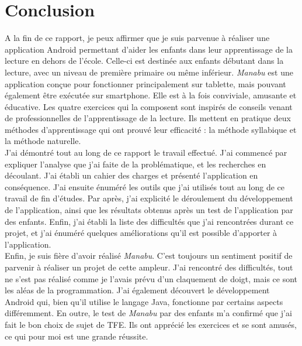 \section{Conclusion}
A la fin de ce rapport, je peux affirmer que je suis parvenue à réaliser une application Android permettant d'aider les enfants dans leur apprentissage de la lecture en dehors de l'école. Celle-ci est destinée aux enfants débutant dans la lecture, avec un niveau de première primaire ou même inférieur. \textit{Manabu} est une application conçue pour fonctionner principalement sur tablette, mais pouvant également être exécutée sur smartphone. Elle est à la fois conviviale, amusante et éducative. Les quatre exercices qui la composent sont inspirés de conseils venant de professionnelles de l'apprentissage de la lecture. Ils mettent en pratique deux méthodes d'apprentissage qui ont prouvé leur efficacité : la méthode syllabique et la méthode naturelle.\\

J'ai démontré tout au long de ce rapport le travail effectué. J'ai commencé par expliquer l'analyse que j'ai faite de la problématique, et les recherches en découlant. J'ai établi un cahier des charges et présenté l'application en conséquence. J'ai ensuite énuméré les outils que j'ai utilisés tout au long de ce travail de fin d'études. Par après, j'ai explicité le déroulement du développement de l'application, ainsi que les résultats obtenus après un test de l'application par des enfants. Enfin, j'ai établi la liste des difficultés que j'ai rencontrées durant ce projet, et j'ai énuméré quelques améliorations qu'il est possible d'apporter à l'application.\\

Enfin, je suis fière d'avoir réalisé \textit{Manabu}. C'est toujours un sentiment positif de parvenir à réaliser un projet de cette ampleur. J'ai rencontré des difficultés, tout ne s'est pas réalisé comme je l'avais prévu d'un claquement de doigt, mais ce sont les aléas de la programmation. J'ai également découvert le développement Android qui, bien qu'il utilise le langage Java, fonctionne par certains aspects différemment. En outre, le test de \textit{Manabu} par des enfants m'a confirmé que j'ai fait le bon choix de sujet de TFE. Ils ont apprécié les exercices et se sont amusés, ce qui pour moi est une grande réussite. 